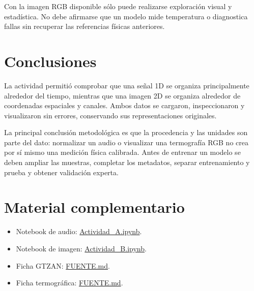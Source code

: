 \documentclass[11pt,a4paper]{article}
\begin{document}
Con la imagen RGB disponible sólo puede realizarse exploración visual y
estadística. No debe afirmarse que un modelo mide temperatura o diagnostica
fallas sin recuperar las referencias físicas anteriores.

\section{Conclusiones}

La actividad permitió comprobar que una señal 1D se organiza principalmente
alrededor del tiempo, mientras que una imagen 2D se organiza alrededor de
coordenadas espaciales y canales. Ambos datos se cargaron, inspeccionaron y
visualizaron sin errores, conservando sus representaciones originales.

La principal conclusión metodológica es que la procedencia y las unidades son
parte del dato: normalizar un audio o visualizar una termografía RGB no crea
por sí mismo una medición física calibrada. Antes de entrenar un modelo se
deben ampliar las muestras, completar los metadatos, separar entrenamiento y
prueba y obtener validación experta.

\section*{Material complementario}

\begin{itemize}
\item Notebook de audio:
\href{../Exploracion_Datos/Notebooks/Actividad_A.ipynb}{Actividad\_A.ipynb}.
\item Notebook de imagen:
\href{../Exploracion_Datos/Notebooks/Actividad_B.ipynb}{Actividad\_B.ipynb}.
\item Ficha GTZAN:
\href{../Exploracion_Datos/Datos/Senal_1D/GTZAN/FUENTE.md}{FUENTE.md}.
\item Ficha termográfica:
\href{../Exploracion_Datos/Datos/Imagen_2D/PV_Termografia/FUENTE.md}{FUENTE.md}.
\end{itemize}
\end{document}
